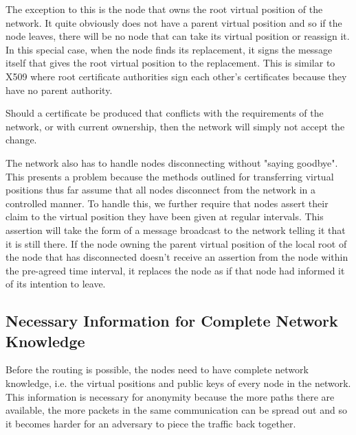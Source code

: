 \documentclass[ %
                    author={Luke Murray},
                supervisor={Dr. Simon Hollis},
                     title={Shadow Peer-to-Peer Networks},
                  subtitle={},
                    degree={MEng},
                      year={2013} ]{thesis}
\begin{document}
The exception to this is the node that owns the root virtual position of the network. It quite obviously does not have a parent virtual position and so if the node leaves, there will be no node that can take its virtual position or reassign it. In this special case, when the node finds its replacement, it signs the message itself that gives the root virtual position to the replacement. This is similar to X509 where root certificate authorities sign each other's certificates because they have no parent authority.

Should a certificate be produced that conflicts with the requirements of the network, or with current ownership, then the network will simply not accept the change.

The network also has to handle nodes disconnecting without "saying goodbye". This presents a problem because the methods outlined for transferring virtual positions thus far assume that all nodes disconnect from the network in a controlled manner. To handle this, we further require that nodes assert their claim to the virtual position they have been given at regular intervals. This assertion will take the form of a message broadcast to the network telling it that it is still there. If the node owning the parent virtual position of the local root of the node that has disconnected doesn't receive an assertion from the node within the pre-agreed time interval, it replaces the node as if that node had informed it of its intention to leave.

\subsection{Necessary Information for Complete Network Knowledge}

Before the routing is possible, the nodes need to have complete network knowledge, i.e. the virtual positions and public keys of every node in the network. This information is necessary for anonymity because the more paths there are available, the more packets in the same communication can be spread out and so it becomes harder for an adversary to piece the traffic back together.
\end{document}
